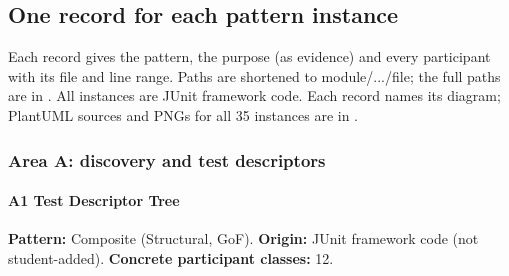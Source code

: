 \documentclass[11pt,a4paper]{article}
\begin{document}
\subsection{One record for each pattern instance}
Each record gives the pattern, the purpose (as evidence) and every participant with its file and line range. Paths are shortened to module/.../file; the full paths are in . All instances are JUnit framework code. Each record names its diagram; PlantUML sources and PNGs for all 35 instances are in .

\subsubsection*{Area A: discovery and test descriptors}
\paragraph{A1 Test Descriptor Tree} \textbf{Pattern:} Composite (Structural, GoF). \textbf{Origin:} JUnit framework code (not student-added). \textbf{Concrete participant classes:} 12.\par
\end{document}
